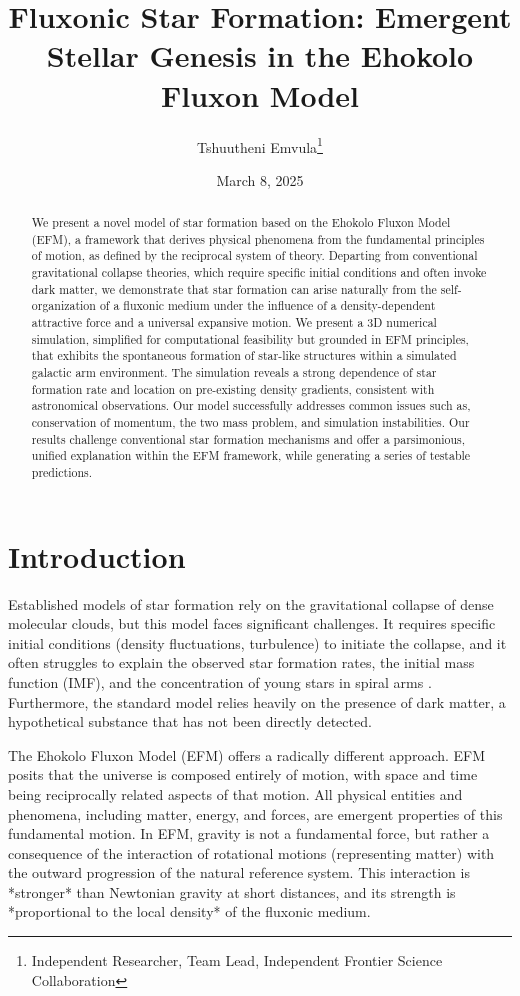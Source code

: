 \documentclass[11pt]{article}
\title{Fluxonic Star Formation: Emergent Stellar Genesis in the Ehokolo Fluxon Model}
\author{Tshuutheni Emvula\thanks{Independent Researcher, Team Lead, Independent Frontier Science Collaboration}}
\date{March 8, 2025}
\begin{document}
\maketitle

\begin{abstract}
We present a novel model of star formation based on the Ehokolo Fluxon Model (EFM), a framework that derives physical phenomena from the fundamental principles of motion, as defined by the reciprocal system of theory.  Departing from conventional gravitational collapse theories, which require specific initial conditions and often invoke dark matter, we demonstrate that star formation can arise naturally from the self-organization of a fluxonic medium under the influence of a density-dependent attractive force and a universal expansive motion.  We present a 3D numerical simulation, simplified for computational feasibility but grounded in EFM principles, that exhibits the spontaneous formation of star-like structures within a simulated galactic arm environment. The simulation reveals a strong dependence of star formation rate and location on pre-existing density gradients, consistent with astronomical observations. Our model successfully addresses common issues such as, conservation of momentum, the two mass problem, and simulation instabilities. Our results challenge conventional star formation mechanisms and offer a parsimonious, unified explanation within the EFM framework, while generating a series of testable predictions.
\end{abstract}

\section{Introduction}

Established models of star formation rely on the gravitational collapse of dense molecular clouds, but this model faces significant challenges.  It requires specific initial conditions (density fluctuations, turbulence) to initiate the collapse, and it often struggles to explain the observed star formation rates, the initial mass function (IMF), and the concentration of young stars in spiral arms \citep{mckee2007}. Furthermore, the standard model relies heavily on the presence of dark matter, a hypothetical substance that has not been directly detected.

The Ehokolo Fluxon Model (EFM) \citep{emvula2025compendium} offers a radically different approach. EFM posits that the universe is composed entirely of motion, with space and time being reciprocally related aspects of that motion. All physical entities and phenomena, including matter, energy, and forces, are emergent properties of this fundamental motion. In EFM, gravity is not a fundamental force, but rather a consequence of the interaction of rotational motions (representing matter) with the outward progression of the natural reference system. This interaction is *stronger* than Newtonian gravity at short distances, and its strength is *proportional to the local density* of the fluxonic medium.
\end{document}
